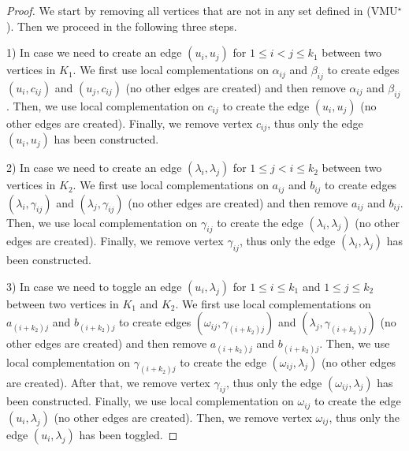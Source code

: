\documentclass[a4paper,UKenglish,cleveref, autoref, thm-restate]{arxiv}
\newcommand{\ls}{\leqslant}
\begin{document}
\begin{proof}
      We start by removing all vertices that are not in any set defined in (VMU$^\star$). Then we proceed in the following three steps. 
      
      1) In case we need to create an edge $(u_i, u_j)$ for $1 \ls i < j \ls k_1$ between two vertices in $K_1$.  We first use local complementations on $\alpha_{ij}$ and $\beta_{ij}$ to create  edges $(u_i,c_{ij})$ and $(u_j, c_{ij})$ (no other edges are created) and then remove $\alpha_{ij}$ and $\beta_{ij}$. Then, we use local complementation on $c_{ij}$ to create the edge $(u_i, u_j)$ (no other edges are created). Finally, we remove vertex $c_{ij}$, thus only the edge $(u_i, u_j)$ has been constructed. 
      
    2)  In case we need to create an edge $(\lambda_i, \lambda_j)$ for $1 \ls j < i \ls k_2$ between two vertices in $K_2$. We first use local complementations on $a_{ij}$ and $b_{ij}$ to create edges $(\lambda_i,\gamma_{ij})$ and $(\lambda_j, \gamma_{ij})$ (no other edges are created) and then remove $a_{ij}$ and $b_{ij}$. Then, we use local complementation on $\gamma_{ij}$ to create the edge $(\lambda_i, \lambda_j)$ (no other edges are created). Finally, we remove vertex $\gamma_{ij}$, thus only the edge $(\lambda_i, \lambda_j)$ has been constructed. 
      
    3)  In case we need to toggle an edge $(u_i, \lambda_j)$ for $1 \ls i \ls k_1$ and $1\ls j \ls k_2$ between two vertices in $K_1$ and $K_2$. We first use local complementations on $a_{(i+k_2)j}$ and $b_{(i+k_2)j}$ to create edges $(\omega_{ij}, \gamma_{(i+k_2)j})$ and $(\lambda_j, \gamma_{(i+k_2)j})$ (no other edges are created) and then remove $a_{(i+k_2)j}$ and $b_{(i+k_2)j}$. Then, we use local complementation on $\gamma_{(i+k_2)j}$ to create the edge $(\omega_{ij}, \lambda_j)$ (no other edges are created). After that, we remove vertex $\gamma_{ij}$, thus only the edge $(\omega_{ij}, \lambda_j)$ has been constructed. Finally, we use local complementation on $\omega_{ij}$ to create the edge $(u_i, \lambda_j)$ (no other edges are created). Then, we remove vertex $\omega_{ij}$, thus only the edge $(u_i, \lambda_j)$ has been toggled.
\end{proof}
\end{document}
